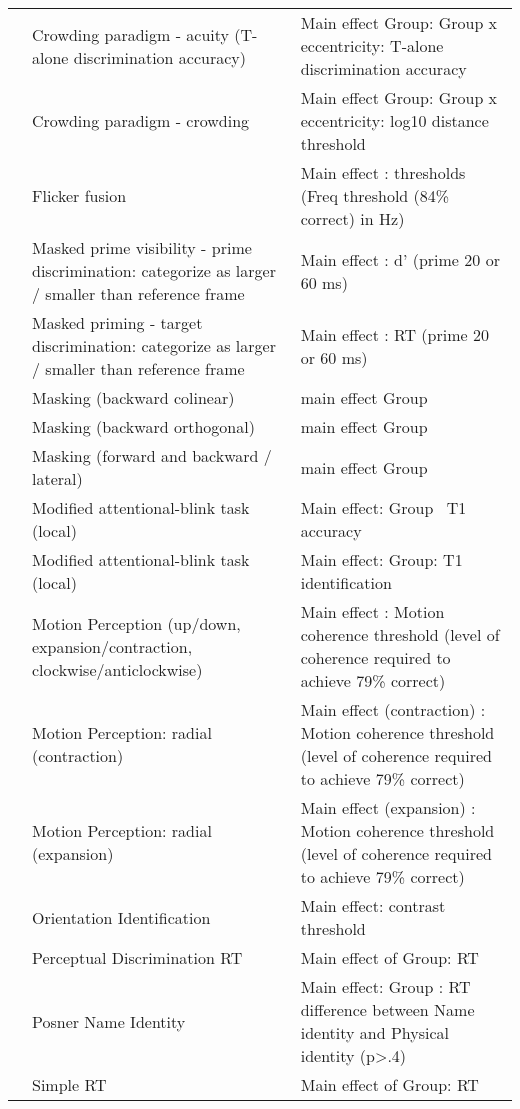 \documentclass[
]{book}
\begin{document}
\begin{tabular}{l|l|l}
\cline{2-3}
 & Crowding paradigm - acuity (T-alone discrimination accuracy) & Main effect Group: Group x eccentricity: T-alone discrimination accuracy\\
\cline{2-3}
 & Crowding paradigm - crowding & Main effect Group: Group x eccentricity: log10 distance threshold\\
\cline{2-3}
 & Flicker fusion & Main effect : thresholds (Freq threshold (84\% correct) in Hz)\\
\cline{2-3}
 & Masked prime visibility - prime discrimination: categorize as larger / smaller than reference frame & Main effect : d' (prime 20 or 60 ms)\\
\cline{2-3}
 & Masked priming - target discrimination: categorize as larger / smaller than reference frame & Main effect : RT (prime 20 or 60 ms)\\
\cline{2-3}
 & Masking (backward colinear) & main effect Group\\
\cline{2-3}
 & Masking (backward orthogonal) & main effect Group\\
\cline{2-3}
 & Masking (forward and backward / lateral) & main effect Group\\
\cline{2-3}
 & Modified attentional-blink task (local) & Main effect: Group  T1 accuracy\\
\cline{2-3}
 & Modified attentional-blink task (local) & Main effect: Group: T1 identification\\
\cline{2-3}
 & Motion Perception (up/down, expansion/contraction, clockwise/anticlockwise) & Main effect : Motion coherence threshold (level of coherence required to achieve 79\% correct)\\
\cline{2-3}
 & Motion Perception: radial (contraction) & Main effect (contraction) : Motion coherence threshold (level of coherence required to achieve 79\% correct)\\
\cline{2-3}
 & Motion Perception: radial (expansion) & Main effect (expansion) : Motion coherence threshold (level of coherence required to achieve 79\% correct)\\
\cline{2-3}
 & Orientation Identification & Main effect: contrast threshold\\
\cline{2-3}
 & Perceptual Discrimination RT & Main effect of Group: RT\\
\cline{2-3}
 & Posner Name Identity & Main effect: Group : RT difference between Name identity and Physical identity (p>.4)\\
\cline{2-3}
 & Simple RT & Main effect of Group: RT\\
\cline{2-3}

\end{tabular}
\end{document}
